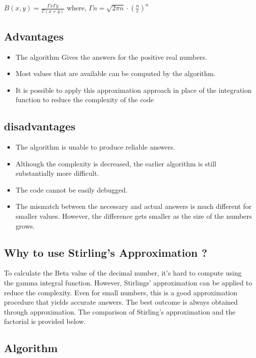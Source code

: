 \documentclass[a4paper, 12pt]{article}
\begin{document}
\begin{center}
    $B(x,y)=\frac{\Gamma x \Gamma y}{\Gamma (x+y)}$ where, $\Gamma n = \sqrt{2 \pi n} \cdot (\frac{n}{e})^n$\\
\end{center}

\subsection{Advantages}
\begin{itemize}
    \item The algorithm Gives the answers for the positive real numbers.
    \item Most values that are available can be computed by the algorithm.
    \item It is possible to apply this approximation approach in place of the integration function to reduce the complexity of the code
\end{itemize}
\subsection{disadvantages}
\begin{itemize}
    \item The algorithm is unable to produce reliable answers.
    \item Although the complexity is decreased, the earlier algorithm is still substantially more difficult.
    \item The code cannot be easily debugged.
    \item The mismatch between the necessary and actual answers is much different for smaller values. However, the difference gets smaller as the size of the numbers grows.
\end{itemize}

\subsection{Why to use Stirling's Approximation ?}
To calculate the Beta value of the decimal number, it's hard to compute using the gamma integral function. However, Stirlings' approximation can be applied to reduce the complexity. Even for small numbers, this is a good approximation procedure that yields accurate answers. The best outcome is always obtained through approximation. The comparison of Stirling's approximation and the factorial is provided below.


\newpage
\subsection{Algorithm}
\end{document}
